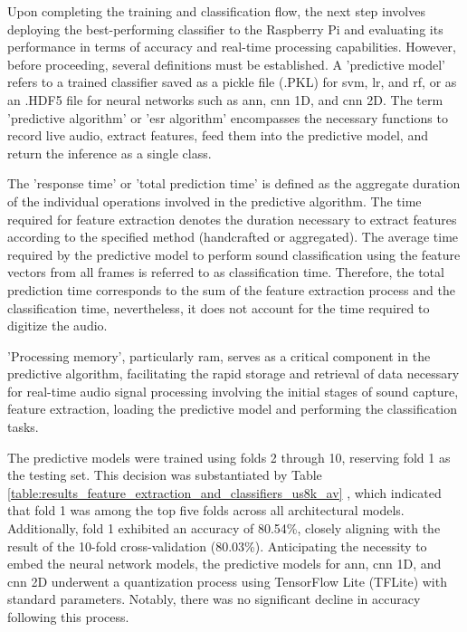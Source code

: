 Upon completing the training and classification flow, the next step involves deploying the best-performing classifier to the Raspberry Pi and evaluating its performance in terms of accuracy and real-time processing capabilities. However, before proceeding, several definitions must be established. A 'predictive model' refers to a trained classifier saved as a pickle file (.PKL) for \gls{svm}, \gls{lr}, and \gls{rf}, or as an .HDF5 file for neural networks such as \gls{ann}, \gls{cnn} 1D, and \gls{cnn} 2D. The term 'predictive algorithm' or '\gls{esr} algorithm' encompasses the necessary functions to record live audio, extract features, feed them into the predictive model, and return the inference as a single class.

The 'response time' or 'total prediction time' is defined as the aggregate duration of the individual operations involved in the predictive algorithm. The time required for feature extraction denotes the duration necessary to extract features according to the specified method (handcrafted or aggregated). The average time required by the predictive model to perform sound classification using the feature vectors from all frames is referred to as classification time. Therefore, the total prediction time corresponds to the sum of the feature extraction process and the classification time, nevertheless, it does not account for the time required to digitize the audio.

'Processing memory', particularly \gls{ram}, serves as a critical component in the predictive algorithm, facilitating the rapid storage and retrieval of data necessary for real-time audio signal processing involving the initial stages of sound capture, feature extraction, loading the predictive model and performing the classification tasks.

The predictive models were trained using folds 2 through 10, reserving fold 1 as the testing set. This decision was substantiated by Table \ref{table:results_feature_extraction_and_classifiers_us8k_av} , which indicated that fold 1 was among the top five folds across all architectural models. Additionally, fold 1 exhibited an accuracy of 80.54\%, closely aligning with the result of the 10-fold cross-validation (80.03\%). Anticipating the necessity to embed the neural network models, the predictive models for \gls{ann}, \gls{cnn} 1D, and \gls{cnn} 2D underwent a quantization process using TensorFlow Lite (TFLite) with standard parameters. Notably, there was no significant decline in accuracy following this process.

